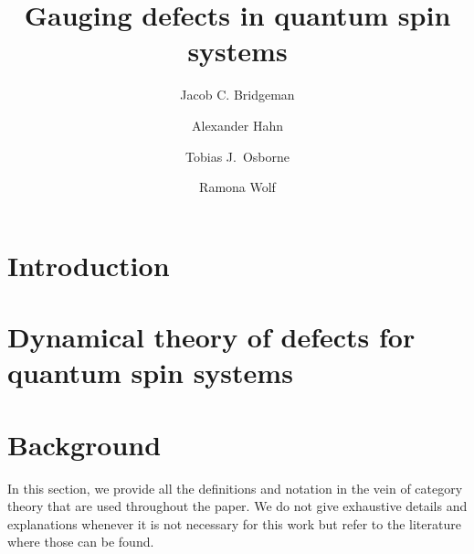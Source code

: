 

\title{Gauging defects in quantum spin systems}
\author{Jacob C. Bridgeman}
\address{Perimeter Institute for Theoretical Physics, Waterloo, Ontario, Canada}
\author{Alexander Hahn}
\author{Tobias J.\ Osborne}
\author{Ramona Wolf}
\address{Institut für Theoretische Physik, Leibniz Universität Hannover, Hannover, Germany}



\newcommand{\jcb}[1]{\textcolor{blue}{#1}}



\begin{abstract}
	
\end{abstract}

\maketitle




\section{Introduction}


\section{Dynamical theory of defects for quantum spin systems}



\section{Background}\label{S:defs}
In this section, we provide all the definitions and notation in the vein of category theory that are used throughout the paper. We do not give exhaustive details and explanations whenever it is not necessary for this work but refer to the literature where those can be found.







